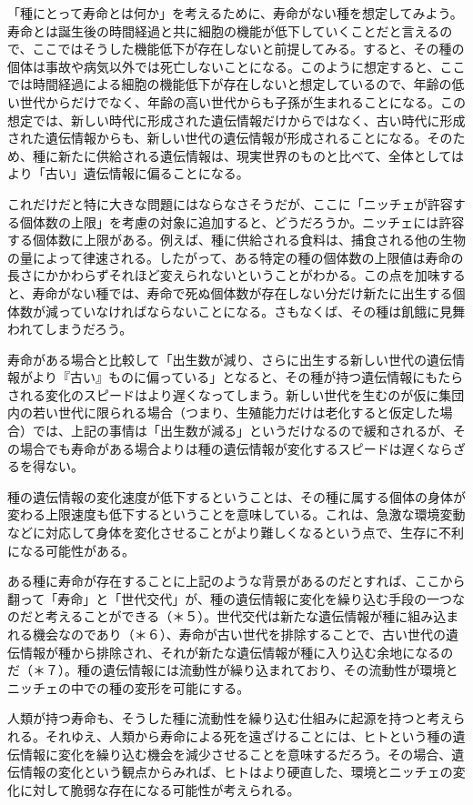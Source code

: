 「種にとって寿命とは何か」を考えるために、寿命がない種を想定してみよう。寿命とは誕生後の時間経過と共に細胞の機能が低下していくことだと言えるので、ここではそうした機能低下が存在しないと前提してみる。すると、その種の個体は事故や病気以外では死亡しないことになる。このように想定すると、ここでは時間経過による細胞の機能低下が存在しないと想定しているので、年齢の低い世代からだけでなく、年齢の高い世代からも子孫が生まれることになる。この想定では、新しい時代に形成された遺伝情報だけからではなく、古い時代に形成された遺伝情報からも、新しい世代の遺伝情報が形成されることになる。そのため、種に新たに供給される遺伝情報は、現実世界のものと比べて、全体としてはより「古い」遺伝情報に偏ることになる。

これだけだと特に大きな問題にはならなさそうだが、ここに「ニッチェが許容する個体数の上限」を考慮の対象に追加すると、どうだろうか。ニッチェには許容する個体数に上限がある。例えば、種に供給される食料は、捕食される他の生物の量によって律速される。したがって、ある特定の種の個体数の上限値は寿命の長さにかかわらずそれほど変えられないということがわかる。この点を加味すると、寿命がない種では、寿命で死ぬ個体数が存在しない分だけ新たに出生する個体数が減っていなければならないことになる。さもなくば、その種は飢餓に見舞われてしまうだろう。

寿命がある場合と比較して「出生数が減り、さらに出生する新しい世代の遺伝情報がより『古い』ものに偏っている」となると、その種が持つ遺伝情報にもたらされる変化のスピードはより遅くなってしまう。新しい世代を生むのが仮に集団内の若い世代に限られる場合（つまり、生殖能力だけは老化すると仮定した場合）では、上記の事情は「出生数が減る」というだけなるので緩和されるが、その場合でも寿命がある場合よりは種の遺伝情報が変化するスピードは遅くならざるを得ない。

種の遺伝情報の変化速度が低下するということは、その種に属する個体の身体が変わる上限速度も低下するということを意味している。これは、急激な環境変動などに対応して身体を変化させることがより難しくなるという点で、生存に不利になる可能性がある。

ある種に寿命が存在することに上記のような背景があるのだとすれば、ここから翻って「寿命」と「世代交代」が、種の遺伝情報に変化を繰り込む手段の一つなのだと考えることができる（＊５）。世代交代は新たな遺伝情報が種に組み込まれる機会なのであり（＊６）、寿命が古い世代を排除することで、古い世代の遺伝情報が種から排除され、それが新たな遺伝情報が種に入り込む余地になるのだ（＊７）。種の遺伝情報には流動性が繰り込まれており、その流動性が環境とニッチェの中での種の変形を可能にする。

人類が持つ寿命も、そうした種に流動性を繰り込む仕組みに起源を持つと考えられる。それゆえ、人類から寿命による死を遠ざけることには、ヒトという種の遺伝情報に変化を繰り込む機会を減少させることを意味するだろう。その場合、遺伝情報の変化という観点からみれば、ヒトはより硬直した、環境とニッチェの変化に対して脆弱な存在になる可能性が考えられる。

